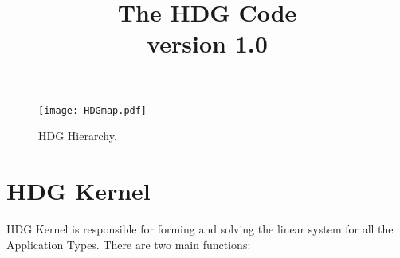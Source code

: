 \documentclass[11pt]{article}
\title{The HDG Code \\ \small{version 1.0}}
\date{}
\begin{document}
\maketitle

\begin{figure}[h]	
\begin{center}
	\texttt{[image: HDGmap.pdf]} 
	\end{center}
		\caption{HDG Hierarchy.}
		 \label{HDGmap}
	\end{figure}

\section{HDG Kernel}

HDG Kernel is responsible for forming and solving the linear system for all the Application Types. There are two main functions: 
\end{document}
